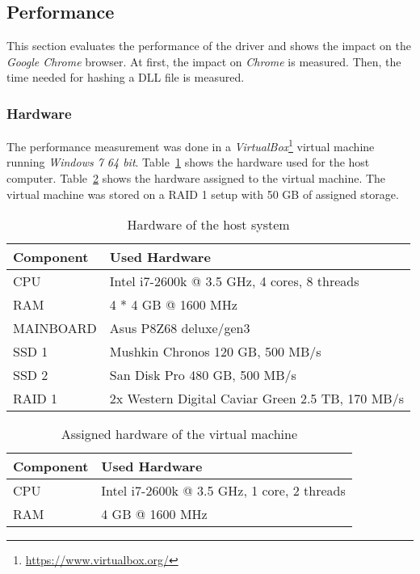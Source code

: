 \subsection{Performance}
\label{sec:performance}
This section evaluates the performance of the driver and shows the impact on the \emph{Google Chrome} browser. At first, the impact on \emph{Chrome} is measured. Then, the time needed for hashing a \gls{DLL} file is measured.

\subsubsection{Hardware}
The performance measurement was done in a \emph{VirtualBox}\footnote{\url{https://www.virtualbox.org/}} virtual machine running \emph{Windows 7 64 bit}. Table~\ref{fig:hardware_host} shows the hardware used for the host computer. Table~\ref{fig:hardware_vm} shows the hardware assigned to the virtual machine. The virtual machine was stored on a RAID 1 setup with 50 GB of assigned storage. 
\begin{table}[bh]
\centering
\caption{Hardware of the host system}
\label{fig:hardware_host}
\begin{tabularx}{\textwidth}{|l|X|}
\hline
Component & Used Hardware \\ \hline
CPU & Intel i7-2600k @ 3.5 GHz, 4 cores, 8 threads \\ \hline
RAM & 4 * 4 GB @ 1600 MHz \\ \hline
MAINBOARD & Asus P8Z68 deluxe/gen3 \\ \hline
SSD 1 & Mushkin Chronos 120 GB, 500 MB/s \\ \hline
SSD 2 & San Disk Pro 480 GB, 500 MB/s \\ \hline
RAID 1 & 2x Western Digital Caviar Green 2.5 TB, 170 MB/s \\ \hline
\end{tabularx}
\end{table}
\begin{table}[bh]
\centering
\caption{Assigned hardware of the virtual machine}
\label{fig:hardware_vm}
\begin{tabularx}{\textwidth}{|l|X|}
\hline
Component & Used Hardware \\ \hline
CPU & Intel i7-2600k @ 3.5 GHz, 1 core, 2 threads \\ \hline
RAM & 4 GB @ 1600 MHz \\ \hline
\end{tabularx}
\end{table}

